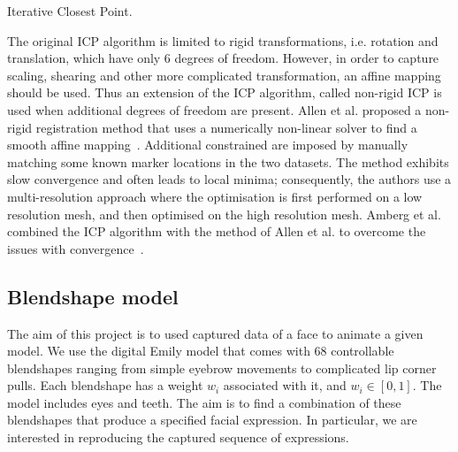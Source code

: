 \documentclass[11pt]{report}
\begin{document}
\begin{algorithm}[H]   \caption{Iterative Closest Point.}
\BlankLine
{}
 \label{alg:icp}
\end{algorithm} 
The original ICP algorithm is limited to rigid transformations, i.e. rotation and translation, which have only $6$ degrees of freedom. However, in order to capture scaling, shearing and other more complicated transformation, an affine mapping should be used. Thus an extension of the ICP algorithm, called non-rigid ICP is used when additional degrees of freedom are present. Allen et al. proposed a non-rigid registration method that uses a numerically non-linear solver to find a smooth affine mapping~\cite{Allen:2003}. Additional constrained are imposed by manually matching some known marker locations in the two datasets. The method exhibits slow convergence and often leads to local minima; consequently, the authors use a multi-resolution approach where the optimisation is first performed on a low resolution mesh, and then optimised on the high resolution mesh. Amberg et al. combined the ICP algorithm with the method of Allen et al. to overcome the issues with convergence~\cite{Amberg:2007}.

\subsection{Blendshape model}
The aim of this project is to used captured data of a face to animate a given model. We use the digital Emily model that comes with $68$ controllable blendshapes ranging from simple eyebrow movements to complicated lip corner pulls. Each blendshape has a weight $w_i$ associated with it, and $w_i \in [0,1]$. The model includes eyes and teeth. The aim is to find a combination of these blendshapes that produce a specified facial expression. In particular, we are interested in reproducing the captured sequence of expressions. 
\end{document}

